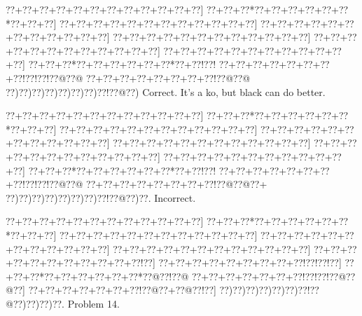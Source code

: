 \documentclass[a5paper]{article}
\begin{document}
\begin{center}
{\goo
\0??+\0??+\0??+\0??+\0??+\0??+\0??+\0??+\0??+\0??+\0??+\0??]
\0??+\0??+\0??*\0??+\0??+\0??+\0??+\0??+\0??*\0??+\0??+\0??]
\0??+\0??+\0??+\0??+\0??+\0??+\0??+\0??+\0??+\0??+\0??+\0??]
\0??+\0??+\0??+\0??+\0??+\0??+\0??+\0??+\0??+\0??+\0??+\0??]
\0??+\0??+\0??+\0??+\0??+\0??+\0??+\0??+\0??+\0??+\0??+\0??]
\0??+\0??+\0??+\0??+\0??+\0??+\0??+\0??+\0??+\0??+\0??+\0??]
\0??+\0??+\0??+\0??+\0??+\0??+\0??+\0??+\0??+\0??+\0??+\0??]
\0??+\0??+\0??*\0??+\0??+\0??+\0??+\0??+\0??*\0??+\0??!\0??!
\0??+\0??+\0??+\0??+\0??+\0??+\0??+\0??!\0??!\0??!\0??@\0??@
\0??+\0??+\0??+\0??+\0??+\0??+\0??+\0??!\0??@\0??@
\0??)\0??)\0??)\0??)\0??)\0??)\0??)\0??!\0??@\0??)
}
Correct. It's a ko, but black can do better. 

\end{center}
\begin{center}
{\goo
\0??+\0??+\0??+\0??+\0??+\0??+\0??+\0??+\0??+\0??+\0??+\0??]
\0??+\0??+\0??*\0??+\0??+\0??+\0??+\0??+\0??*\0??+\0??+\0??]
\0??+\0??+\0??+\0??+\0??+\0??+\0??+\0??+\0??+\0??+\0??+\0??]
\0??+\0??+\0??+\0??+\0??+\0??+\0??+\0??+\0??+\0??+\0??+\0??]
\0??+\0??+\0??+\0??+\0??+\0??+\0??+\0??+\0??+\0??+\0??+\0??]
\0??+\0??+\0??+\0??+\0??+\0??+\0??+\0??+\0??+\0??+\0??+\0??]
\0??+\0??+\0??+\0??+\0??+\0??+\0??+\0??+\0??+\0??+\0??+\0??]
\0??+\0??+\0??*\0??+\0??+\0??+\0??+\0??+\0??*\0??+\0??!\0??!
\0??+\0??+\0??+\0??+\0??+\0??+\0??+\0??!\0??!\0??!\0??@\0??@
\0??+\0??+\0??+\0??+\0??+\0??+\0??+\0??!\0??@\0??@\0??+
\0??)\0??)\0??)\0??)\0??)\0??)\0??)\0??!\0??@\0??)\0??.
}
Incorrect. 

\end{center}
\newpage
\begin{center}
{\goo
\0??+\0??+\0??+\0??+\0??+\0??+\0??+\0??+\0??+\0??+\0??+\0??]
\0??+\0??+\0??*\0??+\0??+\0??+\0??+\0??+\0??*\0??+\0??+\0??]
\0??+\0??+\0??+\0??+\0??+\0??+\0??+\0??+\0??+\0??+\0??+\0??]
\0??+\0??+\0??+\0??+\0??+\0??+\0??+\0??+\0??+\0??+\0??+\0??]
\0??+\0??+\0??+\0??+\0??+\0??+\0??+\0??+\0??+\0??+\0??+\0??]
\0??+\0??+\0??+\0??+\0??+\0??+\0??+\0??+\0??+\0??+\0??!\0??]
\0??+\0??+\0??+\0??+\0??+\0??+\0??+\0??+\0??!\0??!\0??!\0??]
\0??+\0??+\0??*\0??+\0??+\0??+\0??+\0??+\0??*\0??@\0??!\0??@
\0??+\0??+\0??+\0??+\0??+\0??+\0??!\0??!\0??!\0??@\0??@\0??]
\0??+\0??+\0??+\0??+\0??+\0??+\0??!\0??@\0??+\0??@\0??!\0??]
\0??)\0??)\0??)\0??)\0??)\0??)\0??!\0??@\0??)\0??)\0??)\0??.
}
Problem 14.

\end{center}
\end{document}
